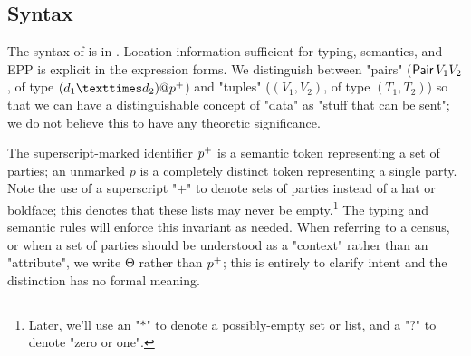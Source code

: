 \subsection{Syntax}\label{sec:syntax}
The syntax of \HLSCentral is in .
Location information sufficient for typing, semantics, and EPP is explicit in
the expression forms.
We distinguish between "pairs"
($\operatorname{\mathsf{Pair}} V_1 V_2$, of type $(d_1 × d_2)@\nonempty{p}$)
and "tuples"
($(V_1, V_2)$, of type $(T_1, T_2)$)
so that we can have a distinguishable concept of "data" as "stuff that can be sent";
we do not believe this to have any theoretic significance.

The superscript-marked identifier ${p^{+}}$ is a semantic token representing a set of parties;
an unmarked $p$ is a completely distinct token representing a single party.
Note the use of a superscript "$+$" to denote sets of parties
instead of a hat or boldface;
this denotes that these lists may never be empty.\footnote{
Later, we'll use an "$\ast$" to denote a possibly-empty set or list,
and a "$?$" to denote "zero or one".
}
The typing and semantic rules will enforce this invariant as needed.
When referring to a census, or when a set of parties should be understood as a "context"
rather than an "attribute",
we write Θ rather than ${p^{+}}$;
this is entirely to clarify intent and the distinction has no formal meaning.

